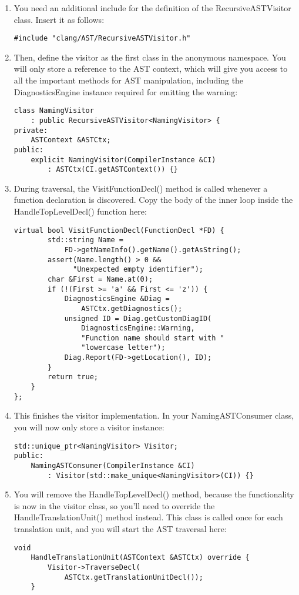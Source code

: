 \begin{enumerate}
\item You need an additional include for the definition of the RecursiveASTVisitor class. Insert it as follows:
\begin{lstlisting}[caption={}]
#include "clang/AST/RecursiveASTVisitor.h"
\end{lstlisting}

\item Then, define the visitor as the first class in the anonymous namespace. You will only store a reference to the AST context, which will give you access to all the important methods for AST manipulation, including the DiagnosticsEngine instance required for emitting the warning:
\begin{lstlisting}[caption={}]
class NamingVisitor
	: public RecursiveASTVisitor<NamingVisitor> {
private:
	ASTContext &ASTCtx;
public:
	explicit NamingVisitor(CompilerInstance &CI)
		: ASTCtx(CI.getASTContext()) {}
\end{lstlisting}

\item During traversal, the VisitFunctionDecl() method is called whenever a function declaration is discovered. Copy the body of the inner loop inside the HandleTopLevelDecl() function here:
\begin{lstlisting}[caption={}]
	virtual bool VisitFunctionDecl(FunctionDecl *FD) {
		std::string Name =
			FD->getNameInfo().getName().getAsString();
		assert(Name.length() > 0 &&
			  "Unexpected empty identifier");
		char &First = Name.at(0);
		if (!(First >= 'a' && First <= 'z')) {
			DiagnosticsEngine &Diag =
				ASTCtx.getDiagnostics();
			unsigned ID = Diag.getCustomDiagID(
				DiagnosticsEngine::Warning,
				"Function name should start with "
				"lowercase letter");
			Diag.Report(FD->getLocation(), ID);
		}
		return true;
	}
};
\end{lstlisting}

\item This finishes the visitor implementation. In your NamingASTConsumer class, you will now only store a visitor instance:
\begin{lstlisting}[caption={}]
	std::unique_ptr<NamingVisitor> Visitor;
public:
	NamingASTConsumer(CompilerInstance &CI)
		: Visitor(std::make_unique<NamingVisitor>(CI)) {}
\end{lstlisting}

\item You will remove the HandleTopLevelDecl() method, because the functionality is now in the visitor class, so you'll need to override the HandleTranslationUnit() method instead. This class is called once for each translation unit, and you will start the AST traversal here:
\begin{lstlisting}[caption={}]
	void
	HandleTranslationUnit(ASTContext &ASTCtx) override {
		Visitor->TraverseDecl(
			ASTCtx.getTranslationUnitDecl());
	}
\end{lstlisting}

\end{enumerate}

